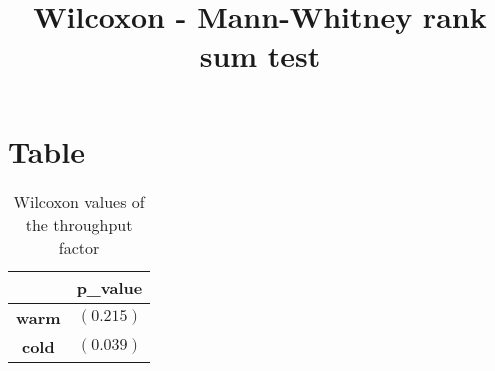 \documentclass{article}
\title{Wilcoxon - Mann-Whitney rank sum test}
\author{}
\begin{document}
\maketitle
\section{Table}
\begin{table}[!htp]
  \caption{Wilcoxon values of the throughput factor}
  \label{table:throughput}
  \centering
  \begin{scriptsize}
  \begin{tabular}{c|c}
      & \textbf{p\_value} \\\hline
      \textbf{warm} & $(0.215)$ \\
      \textbf{cold} & $(0.039)$ \\
  \end{tabular}
  \end{scriptsize}
\end{table}
\end{document}
